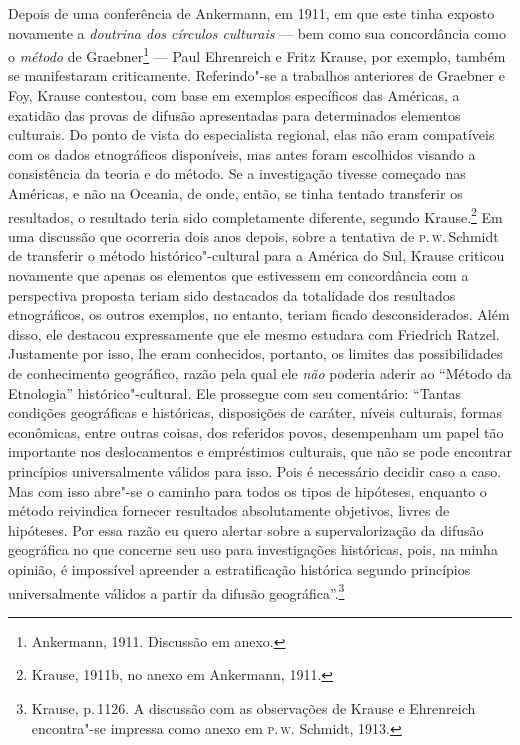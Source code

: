 Depois de uma conferência de Ankermann, em 1911, em que este tinha
exposto novamente a \textit{doutrina dos círculos culturais} --- bem como sua
concordância como o \textit{método} de Graebner\footnote{Ankermann, 1911.
  Discussão em anexo.} --- Paul Ehrenreich e Fritz Krause, por exemplo,
também se manifestaram criticamente. Referindo"-se a trabalhos
anteriores de Graebner e Foy, Krause contestou, com base em exemplos
específicos das Américas, a exatidão das provas de difusão apresentadas
para determinados elementos culturais. Do ponto de vista do especialista
regional, elas não eram compatíveis com os dados etnográficos
disponíveis, mas antes foram escolhidos visando a consistência da teoria
e do método. Se a investigação tivesse começado nas Américas, e não na
Oceania, de onde, então, se tinha tentado transferir os resultados, o
resultado teria sido completamente diferente, segundo Krause.\footnote{Krause,
  1911b, no anexo em Ankermann, 1911.} Em uma discussão que ocorreria
dois anos depois, sobre a tentativa de \textsc{p}.\,\textsc{w}.\,Schmidt de transferir o
método histórico"-cultural para a América do Sul, Krause criticou
novamente que apenas os elementos que estivessem em concordância com a
perspectiva proposta teriam sido destacados da totalidade dos resultados
etnográficos, os outros exemplos, no entanto, teriam ficado
desconsiderados. Além disso, ele destacou expressamente que ele mesmo
estudara com Friedrich Ratzel. Justamente por isso, lhe eram
conhecidos, portanto, os limites das possibilidades de conhecimento
geográfico, razão pela qual ele \textit{não} poderia aderir ao ``Método da
Etnologia'' histórico"-cultural. Ele prossegue com seu comentário:
``Tantas condições geográficas e históricas, disposições de caráter,
níveis culturais, formas econômicas, entre outras coisas, dos referidos
povos, desempenham um papel tão importante nos deslocamentos e
empréstimos culturais, que não se pode encontrar princípios
universalmente válidos para isso. Pois é necessário decidir caso a
caso. Mas com isso abre"-se o caminho para todos os tipos de hipóteses,
enquanto o método reivindica fornecer resultados absolutamente
objetivos, livres de hipóteses. Por essa razão eu quero alertar sobre a
supervalorização da difusão geográfica no que concerne seu uso para
investigações históricas, pois, na minha opinião, é impossível apreender
a estratificação histórica segundo princípios universalmente válidos a
partir da difusão geográfica''.\footnote{Krause, p.\,1126. A discussão
  com as observações de Krause e Ehrenreich encontra"-se impressa como
  anexo em \textsc{p}.\,\textsc{w}. Schmidt, 1913.}


